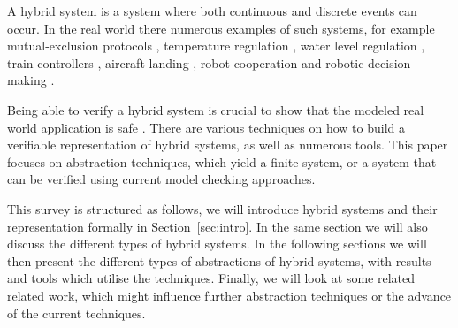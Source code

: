 A hybrid system is a system where both continuous and discrete events can occur. In the real world there numerous examples of such systems, for example mutual-exclusion protocols \cite{Alur1995a}, temperature regulation \cite{Nicollin1993,Amin2006,Raskin2005}, water level regulation \cite{Alur1993}, train controllers \cite{Platzer2011a}, aircraft landing \cite{Tomlin2003}, robot cooperation \cite{Chaimowicz2003} and robotic decision making \cite{Dennis2013a}.

Being able to verify a hybrid system is crucial to show that the modeled real world application is safe \cite{Livadas1998a,Prajna2007}. There are various techniques on how to build a verifiable representation of hybrid systems, as well as numerous tools. This paper focuses on abstraction techniques, which yield a finite system, or a system that can be verified using current model checking approaches.

This survey is structured as follows, we will introduce hybrid systems and their representation formally in Section~\ref{sec:intro}. In the same section we will also discuss the different types of hybrid systems. In the following sections we will then present the different types of abstractions of hybrid systems, with results and tools which utilise the techniques. Finally, we will look at some related related work, which might influence further abstraction techniques or the advance of the current techniques.
